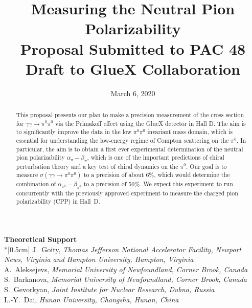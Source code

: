 \documentclass[letterpaper,12pt]{article}
\date{March 6, 2020}
\title{\Large \textbf{Measuring the Neutral Pion Polarizability}\\
\large{Proposal Submitted to PAC 48} \\
\large{ Draft to GlueX Collaboration}
}
\begin{document}
\setlength{\parindent}{2em}


\maketitle

\thispagestyle{empty}

\vspace{3cm}
{\large\textbf {Theoretical Support}} \\*[0.5cm]
\small{J.~Goity, \textit{Thomas Jefferson National Accelerator Facility, Newport News, Virginia and Hampton University, Hampton, Virginia}\\
A.~Aleksejevs,  \textit{Memorial University of Newfoundland, Corner Brook, Canada}\\
S.~Barkanova,  \textit{Memorial University of Newfoundland, Corner Brook, Canada}\\
S.~Gevorkyan,  \textit{Joint Institute for Nuclear Research, Dubna, Russia}\\
L.-Y.~Dai,  \textit{Hunan University, Changsha, Hunan, China}
}



\begin{abstract}
This proposal presents our plan to make a precision measurement of the
cross section for $\gamma \gamma \rightarrow \pi^0 \pi^0$ via the
Primakoff effect using the GlueX detector in Hall D. The aim is to
significantly improve the data in the low $\pi^0\pi^0$ invariant mass
domain, which is essential for understanding the low-energy regime of
Compton scattering on the $\pi^0$. In particular, the aim is to obtain
a first ever experimental determination of the neutral pion
polarizability $\alpha_\pi - \beta_\pi$, which is one of the important
predictions of chiral perturbation theory and a key test of chiral
dynamics on the $\pi^0$.  Our goal is to measure
$\sigma(\gamma\gamma\rightarrow\pi^0\pi^0)$ to a precision of about
6\%, which would determine the combination of
$\alpha_{\pi^0}-\beta_{\pi^0}$ to a precision of 50\%. We expect this
experiment to run concurrently with the previously approved experiment
to measure the charged pion polarizability (CPP) \cite{CPPexp} in
Hall~D.
\end{abstract}
\end{document}
